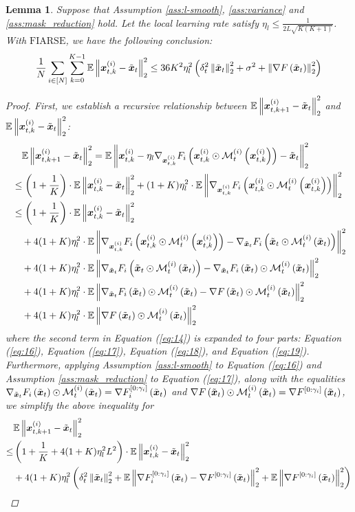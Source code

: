 \documentclass{article}
\theoremstyle{plain}
\newtheorem{lemma}[theorem]{Lemma}
\theoremstyle{definition}
\theoremstyle{remark}
\newcommand{\algo}{\ensuremath{\text{FIARSE}}\xspace}
\newcommand{\E}{\mathbb{E}}
\renewcommand{\eqref}[1]{Equation (\ref{#1})}
\newcommand{\bracket}[1]{\left(#1\right)}
\newcommand{\norm}[1]{\left\|#1\right\|_2^2}
\newcommand{\outergrad}[2]{\nabla_{\x{#2}} F_{#1}\bracket{\x{#2}} \odot \mask{#1}{#2} \bracket{\x{#2}}}
\newcommand{\outergradgamma}[2]{\nabla F_{#1}^{[0: \gamma_{#1}]}\bracket{\x{#2}}}
\newcommand{\globaloutergrad}[2]{\nabla F\bracket{\x{#2}} \odot \mask{#1}{#2} \bracket{\x{#2}}}
\newcommand{\globaloutergradgamma}[2]{\nabla F^{[0: \gamma_{#1}]}\bracket{\x{#2}}}
\begin{document}
\begin{lemma} \label{lemma:2}
Suppose that Assumption \ref{ass:l-smooth}, \ref{ass:variance} and \ref{ass:mask_reduction} hold. Let the local learning rate satisfy $\eta_l \leq \frac{1}{2L\sqrt{K(K+1)}}$. With \algo, we have the following conclusion: 
\begin{align} \label{eq:12}
    \frac{1}{N} \sum_{i \in [N]} \sum_{k=0}^{K-1} \E \norm{\x{i}{t}{k} - \x{t}} \leq 36 K^2 \eta_l^2 \bracket{\delta_t^2 \norm{\x{t}} + \sigma^2 + \norm{\grad{t}}}
\end{align}
\begin{proof}
First, we establish a recursive relationship between $\E\norm{\x{i}{t}{k+1} - \x{t}}$ and $\E\norm{\x{i}{t}{k} - \x{t}}$: 
\begin{align}
&\quad\E\norm{\x{i}{t}{k+1} - \x{t}} = \E\norm{\x{i}{t}{k} -\eta_l \newmaskgrad{i}{t}{k} - \x{t}} \\
&\leq \bracket{1 + \frac{1}{K}} \cdot \E\norm{\x{i}{t}{k} - \x{t}} + (1+K) \eta_l^2 \cdot \E\norm{\newmaskgrad{i}{t}{k}} \label{eq:14} \\
&\leq \bracket{1 + \frac{1}{K}} \cdot \E\norm{\x{i}{t}{k} - \x{t}} \\
&\quad + 4 (1+K) \eta_l^2 \cdot \E\norm{\newmaskgrad{i}{t}{k} - \newmaskgrad{i}{t}} \label{eq:16}\\
&\quad + 4 (1+K) \eta_l^2 \cdot \E\norm{\newmaskgrad{i}{t} - \outergrad{i}{t}} \label{eq:17} \\
&\quad + 4 (1+K) \eta_l^2 \cdot \E\norm{\outergrad{i}{t} - \globaloutergrad{i}{t}} \label{eq:18} \\
&\quad + 4 (1+K) \eta_l^2 \cdot \E\norm{\globaloutergrad{i}{t}} \label{eq:19}
\end{align}
where the second term in \eqref{eq:14} is expanded to four parts: \eqref{eq:16}, \eqref{eq:17}, \eqref{eq:18}, and \eqref{eq:19}. Furthermore, applying Assumption \ref{ass:l-smooth} to \eqref{eq:16} and Assumption \ref{ass:mask_reduction} to \eqref{eq:17}, along with the equalities $\outergrad{i}{t} = \outergradgamma{i}{t}$ and $\globaloutergrad{i}{t} = \globaloutergradgamma{i}{t}$, we simplify the above inequality for
\begin{align}
&\E\norm{\x{i}{t}{k+1} - \x{t}} \\
\leq &\bracket{1 + \frac{1}{K} + 4(1+K) \eta_l^2 L^2} \cdot \E\norm{\x{i}{t}{k} - \x{t}} \label{eq:20}\\
& + 4(1+K) \eta_l^2 \bracket{\delta_t^2 \norm{\x{t}} + \E \norm{\outergradgamma{i}{t} - \globaloutergradgamma{i}{t}} + \E\norm{\globaloutergradgamma{i}{t}}} \label{eq:21}
\end{align}


\end{proof}
\end{lemma}
\end{document}
